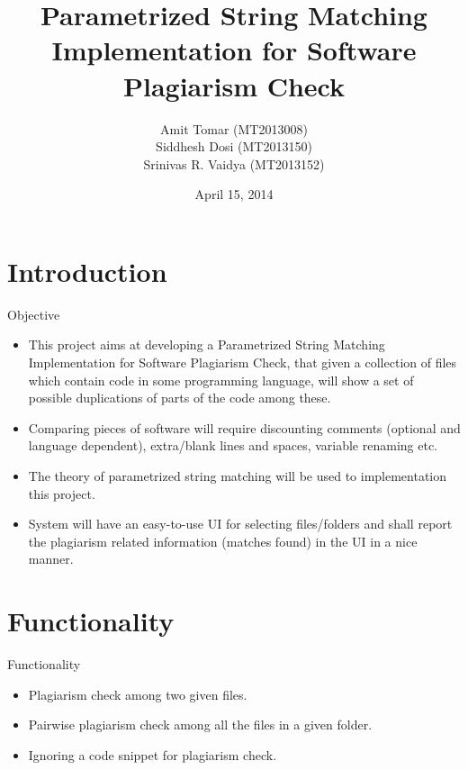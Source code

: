 \documentclass[color=usenames,dvipsnames]{beamer}
\title[Software Plagiarism Check]{Parametrized String Matching Implementation for Software Plagiarism Check}
\author[]{Amit Tomar (MT2013008) \\Siddhesh Dosi  (MT2013150)\\ Srinivas R. Vaidya  (MT2013152) }
\institute[IIIT-Bangalore]{International Institute of Information Technology, Bangalore}
\date{April 15, 2014}
\begin{document}
\begin{frame}
  \titlepage
\end{frame}


\section{Introduction}

\begin{frame}{Objective}

\begin{itemize}

  \setlength{\itemsep}{10pt}
  
\item This project aims at developing a Parametrized String Matching Implementation for Software Plagiarism Check, that given a collection of files which contain code in some programming language, will show a set of possible duplications of parts of the code among these. 
  
\item Comparing pieces of software will require discounting comments (optional and language dependent), extra/blank lines and spaces, variable renaming etc. 
  
\item The theory of parametrized string matching will be used to implementation this project. 

\item  System will have an easy-to-use UI for selecting files/folders and shall report the plagiarism related information (matches found) in the UI in a nice manner.

\end{itemize}
\end{frame}





\section{Functionality}

\begin{frame}{Functionality}

\begin{itemize}

\setlength{\itemsep}{30pt}
  
\item Plagiarism check among two given files. 
  
\item Pairwise plagiarism check among all the files in a given folder. 

\item Ignoring a code snippet for plagiarism check.

\end{itemize}
\end{frame}
\end{document}
